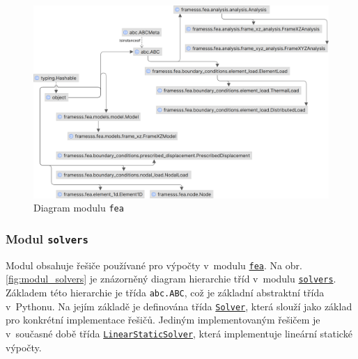 \begin{figure}[H]
    \includegraphics{assets/figures/framesss/uml/fea.png}
    \caption{Diagram modulu \texttt{fea}}
    \label{fig:modul_fea}
\end{figure}

\subsubsection*{Modul \texttt{solvers}}
Modul obsahuje řešiče používané pro výpočty v~modulu
\href{https://danberanek.github.io/framesss/gen/framesss.fea.html}{\texttt{fea}}. Na  obr. \ref{fig:modul_solvers} je znázorněný diagram hierarchie tříd v~modulu
\href{https://danberanek.github.io/framesss/gen/framesss.solvers.html}{\texttt{solvers}}. Základem této hierarchie je třída \texttt{abc.ABC}, což je základní abstraktní třída v~Pythonu. Na jejím základě je definována třída
\href{https://danberanek.github.io/framesss/gen/framesss.solvers.solver.Solver.html}{\texttt{Solver}}, která slouží jako základ pro konkrétní implementace řešičů. Jediným implementovaným řešičem je v~současné době třída
\href{https://danberanek.github.io/framesss/gen/framesss.solvers.linear_static.LinearStaticSolver.html}{\texttt{LinearStaticSolver}}, která implementuje lineární statické výpočty.

